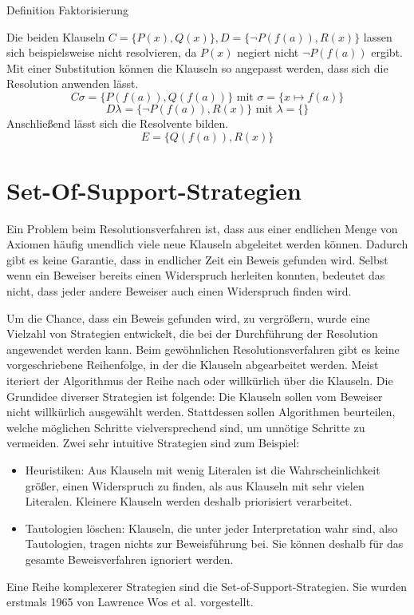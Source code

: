Definition Faktorisierung

 Die beiden Klauseln $C=\{P(x), Q(x)\}, D=\{\neg P(f(a)), R(x)\}$ lassen sich beispielsweise nicht resolvieren, da $P(x)$ negiert nicht $\neg P(f(a))$ ergibt.
Mit einer Substitution können die Klauseln so angepasst werden, dass sich die Resolution anwenden lässt.
$$C\sigma=\{P(f(a)), Q(f(a))\} \text{ mit } \sigma=\{x \mapsto f(a)\}$$
$$D\lambda=\{\neg P(f(a)), R(x)\} \text{ mit } \lambda=\{\}$$
Anschließend lässt sich die Resolvente bilden.
$$E=\{Q(f(a)), R(x)\}$$

	
	\section{Set-Of-Support-Strategien}
Ein Problem beim Resolutionsverfahren ist, dass aus einer endlichen Menge von Axiomen häufig unendlich viele neue Klauseln abgeleitet werden können. Dadurch gibt es keine Garantie, dass in endlicher Zeit ein Beweis gefunden wird. Selbst wenn ein Beweiser bereits einen Widerspruch herleiten konnten, bedeutet das nicht, dass jeder andere Beweiser auch einen Widerspruch finden wird.

Um die Chance, dass ein Beweis gefunden wird, zu vergrößern, wurde eine Vielzahl von Strategien entwickelt, die bei der Durchführung der Resolution angewendet werden kann. Beim gewöhnlichen Resolutionsverfahren gibt es keine vorgeschriebene Reihenfolge, in der die Klauseln abgearbeitet werden. Meist iteriert der Algorithmus der Reihe nach oder willkürlich über die Klauseln. Die Grundidee diverser Strategien ist folgende: Die Klauseln sollen vom Beweiser nicht willkürlich ausgewählt werden. Stattdessen sollen Algorithmen beurteilen, welche möglichen Schritte vielversprechend sind, um unnötige Schritte zu vermeiden. Zwei sehr intuitive Strategien sind zum Beispiel:
\begin{itemize}
	\item Heuristiken: Aus Klauseln mit wenig Literalen ist die Wahrscheinlichkeit größer, einen Widerspruch zu finden, als aus Klauseln mit sehr vielen Literalen. Kleinere Klauseln werden deshalb priorisiert verarbeitet.
	\item Tautologien löschen: Klauseln, die unter jeder Interpretation wahr sind, also Tautologien, tragen nichts zur Beweisführung bei. Sie können deshalb für das gesamte Beweisverfahren ignoriert werden.
\end{itemize}

Eine Reihe komplexerer Strategien sind die Set-of-Support-Strategien. Sie wurden erstmals 1965 von Lawrence Wos et al. vorgestellt. \cite{Wos1965Sos}

